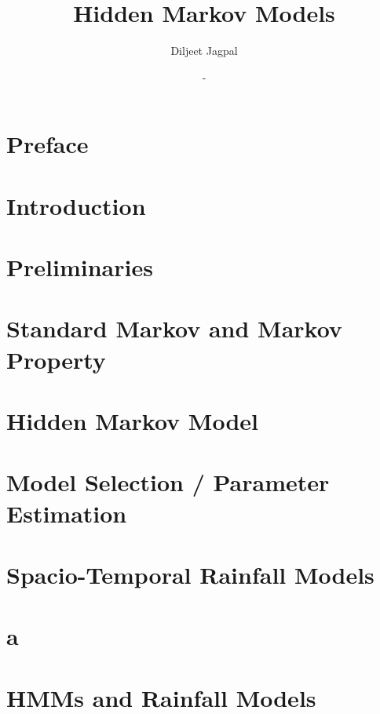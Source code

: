 \documentclass[a4paper,12pt]{report}
\title{\Huge Hidden Markov Models}
\author{Diljeet Jagpal}
\date{-}
\theoremstyle{plain}
\begin{document}
	\maketitle
	\tableofcontents

	\chapter*{Preface}
	

	\newpage

	\chapter{Introduction}
	
	\newpage

	\chapter{Preliminaries}
	
	\newpage

	\chapter{Standard Markov and Markov Property}
	
	\newpage

	\chapter{Hidden Markov Model}
	
	\newpage

	\chapter{Model Selection  / Parameter Estimation}
	
	\newpage

	\chapter{Spacio-Temporal Rainfall Models}
	
	\newpage

	\chapter{a}
	
	\newpage

	\chapter{HMMs and Rainfall Models}
	
	\newpage


	\nocite{*}
	\printbibliography
\end{document}
